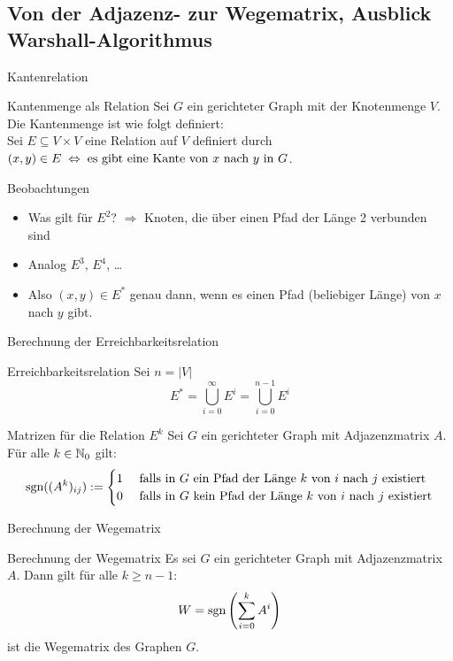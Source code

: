 \subsection{Von der Adjazenz- zur Wegematrix, Ausblick Warshall-Algorithmus}
\begin{frame}{Kantenrelation}
	\begin{block}{Kantenmenge als Relation}
		Sei $G$ ein gerichteter Graph mit der Knotenmenge $V$. Die Kantenmenge ist wie folgt definiert:\\
		Sei $E \subseteq V \times V$ eine Relation auf $V$ definiert durch $(x,y) \in E \gdw \text{es gibt eine Kante von $x$ nach }y \text{ in } G$.
	\end{block}

	\begin{exampleblock}{Beobachtungen}
		\begin{itemize}
			\item Was gilt für $E^2$? \pause $\Rightarrow$ Knoten, die über einen Pfad der Länge 2 verbunden sind
			\item Analog $E^3$, $E^4$, \dots
			\item Also $(x,y) \in E^*$ genau dann, wenn es einen Pfad (beliebiger Länge) von $x$ nach $y$ gibt.
		\end{itemize}
	\end{exampleblock}
\end{frame}

\begin{frame}{Berechnung der Erreichbarkeitsrelation}
    \begin{block}{Erreichbarkeitsrelation}
        Sei $n = |V|$
    	\[
    		E^* = \bigcup_{i=0}^{\infty} E^i = \bigcup_{i=0}^{n-1} E^i
    	\]
    \end{block}

    \begin{block}{Matrizen für die Relation $E^k$}
    	Sei $G$ ein gerichteter Graph mit Adjazenzmatrix $A$. Für alle $k \in \mathbb{N}_0$ gilt:\\
    	\[
    		\mathop{\text{sgn}}((A^k)_{ij}):=
    		\begin{cases}
      		1 & \text{ falls in $G$ ein Pfad der Länge $k$ von $i$ nach $j$ existiert}\\
      		0 & \text{ falls in $G$ kein Pfad der Länge $k$ von $i$ nach $j$ existiert}\\
    		\end{cases}
    	\]
    \end{block}
\end{frame}

\begin{frame}{Berechnung der Wegematrix}	
    \begin{block}{Berechnung der Wegematrix}
    	Es sei $G$ ein gerichteter Graph mit Adjazenzmatrix $A$. Dann gilt für alle $k\geq n-1$: 
    	\[
    		W = \mathop{\text{sgn}}\left(\sum_{i=0}^{k} A^i\right) 
    	\]
    	ist die Wegematrix des Graphen $G$.
    \end{block}
\end{frame}